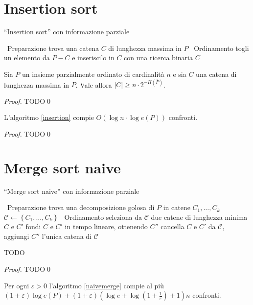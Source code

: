 \section{Insertion sort} 
\begin{algorithm}
	\caption{``Insertion sort'' con informazione parziale} \label{insertion} 
	\begin{algorithmic}
		[1] \STATE \, \COMMENT Preparazione \STATE trova una catena \(C\) di lunghezza massima in \(P\) \STATE \, \COMMENT Ordinamento  \STATE togli un elemento da \(P-C\) e inseriscilo in \(C\) con una ricerca binaria \ENDWHILE \RETURN \(C\) 
	\end{algorithmic}
\end{algorithm}
\begin{lemma}
	\label{maxchainlemma} Sia \(P\) un insieme parzialmente ordinato di cardinalità \(n\) e sia \(C\) una catena di lunghezza massima in \(P\). Vale allora \(\left|C\right|\ge n\cdot2^{-H(\overline{P})}\). 
\end{lemma}
\begin{proof}
	TODO\qed 
\end{proof}
\begin{theorem}
	L'algoritmo \ref{insertion} compie \(O(\log{n}\cdot\log{e(P)})\) confronti. 
\end{theorem}
\begin{proof}
	TODO\qed 
\end{proof}

\section{Merge sort naive} 
\begin{algorithm}
	\caption{``Merge sort naive'' con informazione parziale} \label{naivemerge} 
	\begin{algorithmic}
		[1] \STATE \, \COMMENT Preparazione \STATE trova una decomposizione golosa di \(P\) in catene \(C_1,\dots,C_k\) \STATE \(\mathcal{C}\leftarrow\left\{C_1,\dots,C_k\right\}\) \STATE \, \COMMENT Ordinamento  \STATE seleziona da \(\mathcal{C}\) due catene di lunghezza minima \(C\) e \(C'\) \STATE fondi \(C\) e \(C'\) in tempo lineare, ottenendo \(C''\) \STATE cancella \(C\) e \(C'\) da \(\mathcal{C}\), aggiungi \(C''\) \ENDWHILE \RETURN l'unica catena di \(\mathcal{C}\) 
	\end{algorithmic}
\end{algorithm}
\begin{lemma}
	TODO 
\end{lemma}
\begin{proof}
	TODO\qed 
\end{proof}
\begin{theorem}
	\label{naivemergetheorem} Per ogni \(\varepsilon>0\) l'algoritmo \ref{naivemerge} compie al più \((1+\varepsilon)\log{e(P)}+(1+\varepsilon)(\log{e}+\log{(1+\frac{1}{\varepsilon})}+1)n\) confronti. 
\end{theorem}

